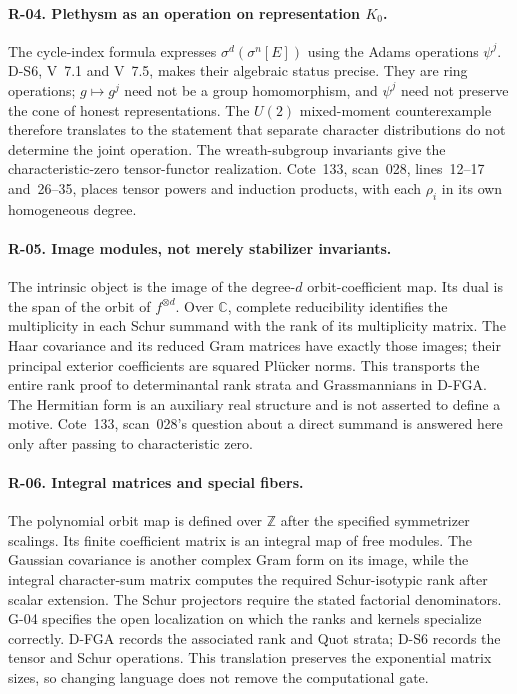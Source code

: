\paragraph{R-04. Plethysm as an operation on representation $K_0$.}
The cycle-index formula expresses $\sigma^d(\sigma^n[E])$ using the Adams operations $\psi^j$. D-S6, V~7.1 and V~7.5, makes their algebraic status precise. They are ring operations; $g\mapsto g^j$ need not be a group homomorphism, and $\psi^j$ need not preserve the cone of honest representations. The $U(2)$ mixed-moment counterexample therefore translates to the statement that separate character distributions do not determine the joint operation. The wreath-subgroup invariants give the characteristic-zero tensor-functor realization. Cote~133, scan~028, lines~12--17 and~26--35, places tensor powers and induction products, with each $\rho_i$ in its own homogeneous degree.

\paragraph{R-05. Image modules, not merely stabilizer invariants.}
The intrinsic object is the image of the degree-$d$ orbit-coefficient map. Its dual is the span of the orbit of $f^{\otimes d}$. Over $\mathbb C$, complete reducibility identifies the multiplicity in each Schur summand with the rank of its multiplicity matrix. The Haar covariance and its reduced Gram matrices have exactly those images; their principal exterior coefficients are squared Pl\"ucker norms. This transports the entire rank proof to determinantal rank strata and Grassmannians in D-FGA. The Hermitian form is an auxiliary real structure and is not asserted to define a motive. Cote~133, scan~028's question about a direct summand is answered here only after passing to characteristic zero.

\paragraph{R-06. Integral matrices and special fibers.}
The polynomial orbit map is defined over $\mathbb Z$ after the specified symmetrizer scalings. Its finite coefficient matrix is an integral map of free modules. The Gaussian covariance is another complex Gram form on its image, while the integral character-sum matrix computes the required Schur-isotypic rank after scalar extension. The Schur projectors require the stated factorial denominators. G-04 specifies the open localization on which the ranks and kernels specialize correctly. D-FGA records the associated rank and Quot strata; D-S6 records the tensor and Schur operations. This translation preserves the exponential matrix sizes, so changing language does not remove the computational gate.

